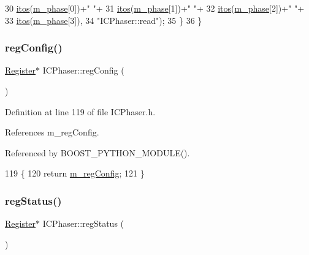 \begin{DoxyCode}
30         \hyperlink{Tools_8h_af330027dbdafb9a30768b3613c553e60}{itos}(\hyperlink{classICPhaser_afe2a4527d58d08342d631dfa7c731203}{m\_phase}[0])+\textcolor{stringliteral}{" "}+
31         \hyperlink{Tools_8h_af330027dbdafb9a30768b3613c553e60}{itos}(\hyperlink{classICPhaser_afe2a4527d58d08342d631dfa7c731203}{m\_phase}[1])+\textcolor{stringliteral}{" "}+
32         \hyperlink{Tools_8h_af330027dbdafb9a30768b3613c553e60}{itos}(\hyperlink{classICPhaser_afe2a4527d58d08342d631dfa7c731203}{m\_phase}[2])+\textcolor{stringliteral}{" "}+
33         \hyperlink{Tools_8h_af330027dbdafb9a30768b3613c553e60}{itos}(\hyperlink{classICPhaser_afe2a4527d58d08342d631dfa7c731203}{m\_phase}[3]),
34         \textcolor{stringliteral}{"ICPhaser::read"});
35   \}
36 \}
\end{DoxyCode}
\mbox{\label{classICPhaser_ae22a3e794e85fbcafa154b4ba2d2e8d1}} 
\subsubsection{\texorpdfstring{reg\+Config()}{regConfig()}}
{\footnotesize\ttfamily \hyperlink{classRegister}{Register}$\ast$ I\+C\+Phaser\+::reg\+Config (\begin{DoxyParamCaption}{ }\end{DoxyParamCaption})\hspace{0.3cm}{\ttfamily [inline]}}



Definition at line 119 of file I\+C\+Phaser.\+h.



References m\+\_\+reg\+Config.



Referenced by B\+O\+O\+S\+T\+\_\+\+P\+Y\+T\+H\+O\+N\+\_\+\+M\+O\+D\+U\+L\+E().


\begin{DoxyCode}
119                        \{
120     \textcolor{keywordflow}{return} \hyperlink{classICPhaser_af135fe05b7c087639789afe470e88ce4}{m\_regConfig};
121   \}
\end{DoxyCode}
\mbox{\label{classICPhaser_a075f0f88445142d07a02c21401a0e342}} 
\subsubsection{\texorpdfstring{reg\+Status()}{regStatus()}}
{\footnotesize\ttfamily \hyperlink{classRegister}{Register}$\ast$ I\+C\+Phaser\+::reg\+Status (\begin{DoxyParamCaption}{ }\end{DoxyParamCaption})\hspace{0.3cm}{\ttfamily [inline]}}



